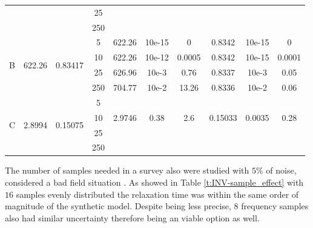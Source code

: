 \documentclass{vie16}
\begin{document}
\begin{table}[H]
\begin{adjustbox}{scale=0.8}
\begin{tabular}{|c|cc|c|ccc|ccc|}
 &  &  & 25 &  &  &  &  &  &  \\
 &  &  & 250 &  &  &  &  &  &  \\ \hline
\multirow{4}{*}{B} & \multirow{4}{*}{622.26} & \multirow{4}{*}{0.83417} &
					5  & 622.26  & 10e-15 &  0      & 0.8342 & 10e-15 & 0  \\
 &  &  & 10  & 622.26  & 10e-12 &  0.0005 & 0.8342 & 10e-15 & 0.0001 \\
 &  &  & 25  & 626.96  & 10e-3  &  0.76   & 0.8337 & 10e-3  & 0.05 \\
 &  &  & 250 & 704.77  & 10e-2  &  13.26  & 0.8336 & 10e-2  & 0.06 \\ \hline
\multirow{4}{*}{C} & \multirow{4}{*}{2.8994} & \multirow{4}{*}{0.15075} & 5 &  &  &  &  &  &  \\
 &  &  & 10 & 2.9746 & 0.38 & 2.6 & 0.15033 & 0.0035 & 0.28 \\
 &  &  & 25 &  &  &  &  &  &  \\
 &  &  & 250 &  &  &  &  &  &  \\ \hline
\end{tabular}
\end{adjustbox}
\end{table}
The number of samples needed in a survey also were studied with $5\%$ of noise, considered a bad %
field situation \citet{sandor11}. As showed in Table \ref{t:INV-sample_effect} with $16$ samples evenly distributed the relaxation 
time was within the same order of magnitude of the synthetic model. Despite being less precise, $8$ frequency samples also had similar uncertainty therefore being an viable option as well.
\end{document}
